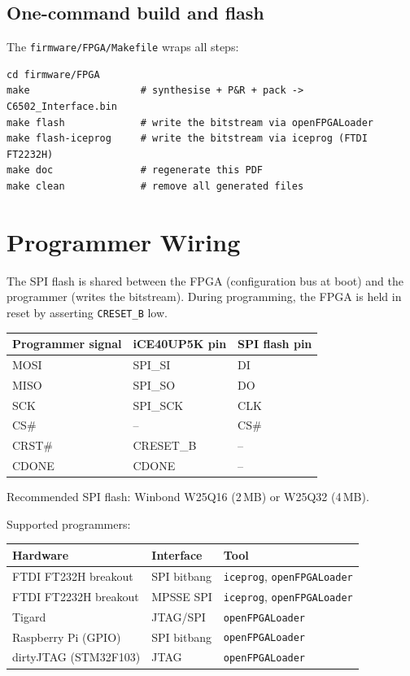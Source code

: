\documentclass[11pt,a4paper]{article}
\newcommand{\cmd}[1]{\texttt{#1}}
\newcommand{\sig}[1]{\texttt{#1}}
\newcommand{\file}[1]{\texttt{#1}}
\begin{document}
\subsection{One-command build and flash}

The \file{firmware/FPGA/Makefile} wraps all steps:

\begin{lstlisting}[style=shell]
cd firmware/FPGA
make                   # synthesise + P&R + pack -> C6502_Interface.bin
make flash             # write the bitstream via openFPGALoader
make flash-iceprog     # write the bitstream via iceprog (FTDI FT2232H)
make doc               # regenerate this PDF
make clean             # remove all generated files
\end{lstlisting}

\section{Programmer Wiring}

The SPI flash is shared between the FPGA (configuration bus at boot)
and the programmer (writes the bitstream).  During programming, the
FPGA is held in reset by asserting \sig{CRESET\_B} low.

\begin{center}
\begin{tabular}{lll}
\toprule
\textbf{Programmer signal} & \textbf{iCE40UP5K pin} & \textbf{SPI flash pin} \\
\midrule
MOSI  & SPI\_SI   & DI  \\
MISO  & SPI\_SO   & DO  \\
SCK   & SPI\_SCK  & CLK \\
CS\#  & --        & CS\# \\
CRST\# & CRESET\_B & -- \\
CDONE & CDONE     & -- \\
\bottomrule
\end{tabular}
\end{center}

Recommended SPI flash: Winbond W25Q16 (2\,MB) or W25Q32 (4\,MB).

Supported programmers:

\begin{center}
\begin{tabular}{lll}
\toprule
\textbf{Hardware} & \textbf{Interface} & \textbf{Tool} \\
\midrule
FTDI FT232H breakout   & SPI bitbang & \cmd{iceprog}, \cmd{openFPGALoader} \\
FTDI FT2232H breakout  & MPSSE SPI   & \cmd{iceprog}, \cmd{openFPGALoader} \\
Tigard                 & JTAG/SPI    & \cmd{openFPGALoader} \\
Raspberry Pi (GPIO)    & SPI bitbang & \cmd{openFPGALoader} \\
dirtyJTAG (STM32F103)  & JTAG        & \cmd{openFPGALoader} \\
\bottomrule
\end{tabular}
\end{center}
\end{document}
